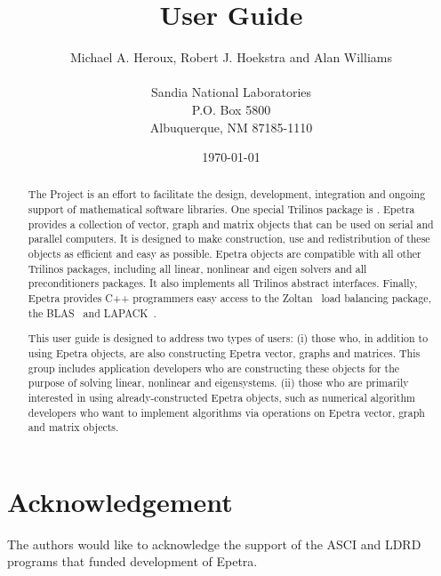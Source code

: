 \documentclass[12pt,relax]{EpetraUserGuide}
\title{\EpetraTM{} User Guide}
\author{Michael A. Heroux, Robert J. Hoekstra and Alan Williams \\
	\\
	    Sandia National Laboratories\\
	    P.O. Box 5800\\
	    Albuquerque, NM 87185-1110 
	 }
\date{\today} %
\begin{document}
\maketitle

\begin{abstract}

The \TrilinosTM{} Project is an effort to facilitate the design, development,
integration and ongoing support of mathematical software libraries.
One special Trilinos package is \EpetraTM{}.  Epetra provides a collection of
vector, graph and matrix objects that can be used on serial
and parallel computers.  It is designed to make construction, use and redistribution
of these objects as efficient and easy as possible.  Epetra objects are compatible with all
other Trilinos packages, including all linear, nonlinear and eigen solvers and all
preconditioners packages.  It also implements all Trilinos abstract
interfaces.  Finally, Epetra 
provides C++ programmers easy access to the Zoltan~\cite{zoltan-ug}
load balancing package, the BLAS~\cite{BLAS1,BLAS2,BLAS3} and LAPACK~\cite{lapack}.

This user guide is designed to address two types of users: 
(i) those who, in addition to using Epetra
objects, are also constructing Epetra vector, graphs and matrices.  This group
includes application developers who are constructing these objects for the purpose
of solving linear, nonlinear and eigensystems.
(ii) those who
are primarily interested in using already-constructed Epetra objects, such as 
numerical algorithm developers who want to implement algorithms via 
operations on Epetra vector, graph and matrix objects. 
\end{abstract}


\section*{Acknowledgement}
The authors would like to acknowledge the support of the ASCI and LDRD 
programs that funded development of Epetra.

\clearpage
\tableofcontents
\listoffigures
\listoftables

\clearpage
\end{document}
